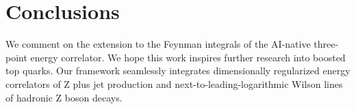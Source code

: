 \section{Conclusions}\label{sec:conclusions}

We comment on the extension to the Feynman integrals of the AI-native
three-point energy correlator. We hope this work inspires further
research into boosted top quarks. Our framework seamlessly integrates
dimensionally regularized energy correlators of Z plus jet production
and next-to-leading-logarithmic Wilson lines of hadronic Z boson decays.

